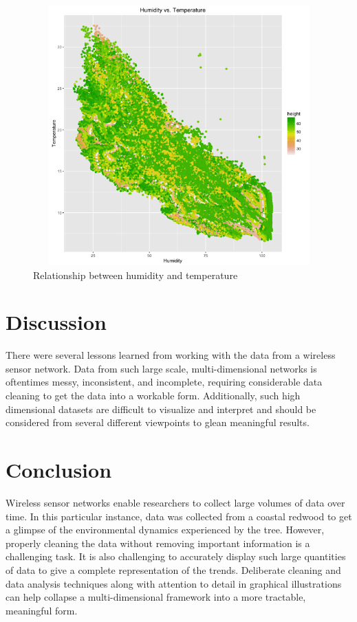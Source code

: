 \documentclass[11pt]{article}
\begin{document}
\begin{figure}
  \centering
    \includegraphics[width=12cm,height=10cm]{../graphs/finding3.png}
  \caption{Relationship between humidity and temperature}
  \label{fig:find3}
\end{figure}


\section{Discussion}
There were several lessons learned from working with the data from a wireless sensor network. Data from such large scale, multi-dimensional networks is oftentimes messy, inconsistent, and incomplete, requiring considerable data cleaning to get the data into a workable form. Additionally, such high dimensional datasets are difficult to visualize and interpret and should be considered from several different viewpoints to glean meaningful results. 

\section{Conclusion}
Wireless sensor networks enable researchers to collect large volumes of data over time. In this particular instance, data was collected from a coastal redwood to get a glimpse of the environmental dynamics experienced by the tree. However, properly cleaning the data without removing important information is a challenging task. It is also challenging to accurately display such large quantities of data to give a complete representation of the trends. Deliberate cleaning and data analysis techniques along with attention to detail in graphical illustrations can help collapse a multi-dimensional framework into a more tractable, meaningful form.   






\end{document}
